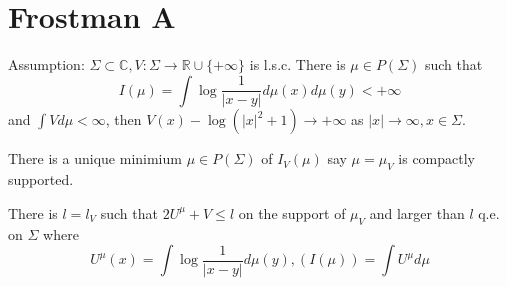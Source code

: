 \documentclass[lang=en, color=blue, ]{elegantbook}
\newcommand{\R}{\mathbb{R}}
\newcommand{\C}{\mathbb{C}}
\begin{document}
\section{Frostman A}

Assumption: $\Sigma \subset \C, V:\Sigma \to \R\cup\{+\infty\}$ is l.s.c. There is $\mu \in P(\Sigma)$ such that
\[
I(\mu) = \int \log \dfrac{1}{|x-y|}d\mu(x)d\mu(y) < +\infty
\]
and $\int Vd\mu < \infty$, then $V(x) - \log(|x|^2+1) \to +\infty$ as $|x|\to \infty, x\in \Sigma$.

\begin{theorem}
    There is a unique minimium $\mu \in P(\Sigma)$ of $I_V(\mu)$ say $\mu = \mu_V$ is compactly supported.
\end{theorem}

\begin{theorem}
    There is $l = l_V$ such that $2U^{\mu} + V  \leq l$ on the support of $\mu_V$ and larger than $l$ q.e. on $\Sigma$ where
    \[
    U^{\mu}(x) = \int\log\dfrac{1}{|x-y|}d\mu(y), (I(\mu)) = \int U^{\mu}d\mu
    \]
\end{theorem}
\end{document}
